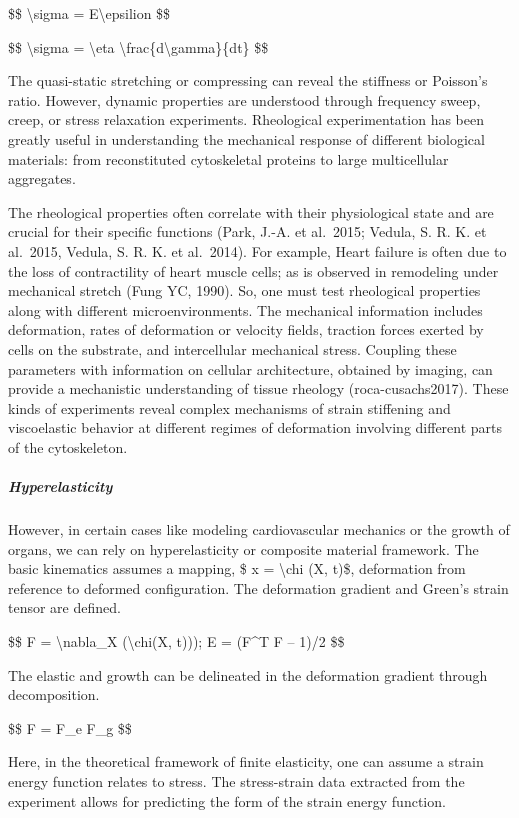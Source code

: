 \documentclass[
]{article}
\begin{document}
\$\$ \textbackslash sigma = E\textbackslash epsilion \$\$

\$\$ \textbackslash sigma = \textbackslash eta
\textbackslash frac\{d\textbackslash gamma\}\{dt\} \$\$

The quasi-static stretching or compressing can reveal the stiffness or
Poisson's ratio. However, dynamic properties are understood through
frequency sweep, creep, or stress relaxation experiments. Rheological
experimentation has been greatly useful in understanding the mechanical
response of different biological materials: from reconstituted
cytoskeletal proteins to large multicellular aggregates.

The rheological properties often correlate with their physiological
state and are crucial for their specific functions (Park, J.-A. et
al.~2015; Vedula, S. R. K. et al.~2015, Vedula, S. R. K. et al.~2014).
For example, Heart failure is often due to the loss of contractility of
heart muscle cells; as is observed in remodeling under mechanical
stretch (Fung YC, 1990). So, one must test rheological properties along
with different microenvironments. The mechanical information includes
deformation, rates of deformation or velocity fields, traction forces
exerted by cells on the substrate, and intercellular mechanical stress.
Coupling these parameters with information on cellular architecture,
obtained by imaging, can provide a mechanistic understanding of tissue
rheology (roca-cusachs2017). These kinds of experiments reveal complex
mechanisms of strain stiffening and viscoelastic behavior at different
regimes of deformation involving different parts of the cytoskeleton.

\hypertarget{hyperelasticity}{%
\subparagraph{Hyperelasticity}\label{hyperelasticity}}

However, in certain cases like modeling cardiovascular mechanics or the
growth of organs, we can rely on hyperelasticity or composite material
framework. The basic kinematics assumes a mapping, \$ x =
\textbackslash chi (X, t)\$, deformation from reference to deformed
configuration. The deformation gradient and Green's strain tensor are
defined.

\$\$ F = \textbackslash nabla\_X (\textbackslash chi(X, t))); E =
(F\^{}T F -- 1)/2 \$\$

The elastic and growth can be delineated in the deformation gradient
through decomposition.

\$\$ F = F\_e F\_g \$\$

Here, in the theoretical framework of finite elasticity, one can assume
a strain energy function relates to stress. The stress-strain data
extracted from the experiment allows for predicting the form of the
strain energy function.
\end{document}

